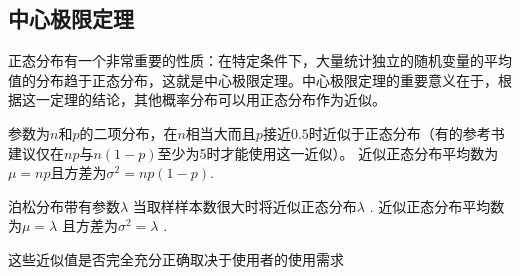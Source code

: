 \documentclass[openany]{book}
\begin{document}
\subsection{中心极限定理}
正态分布有一个非常重要的性质：在特定条件下，大量统计独立的随机变量的平均值的分布趋于正态分布，这就是中心极限定理。中心极限定理的重要意义在于，根据这一定理的结论，其他概率分布可以用正态分布作为近似。

参数为$n$和$p$的二项分布，在$n$相当大而且$p$接近$0.5$时近似于正态分布（有的参考书建议仅在$np$与$n(1-p)$至少为5时才能使用这一近似）。
近似正态分布平均数为$\mu =np$且方差为$\sigma ^{2}=np(1-p)$.

泊松分布带有参数$\lambda$ 当取样样本数很大时将近似正态分布$\lambda$ .
近似正态分布平均数为$\mu =\lambda$ 且方差为$\sigma ^{2}=\lambda$ .

这些近似值是否完全充分正确取决于使用者的使用需求
\end{document}
